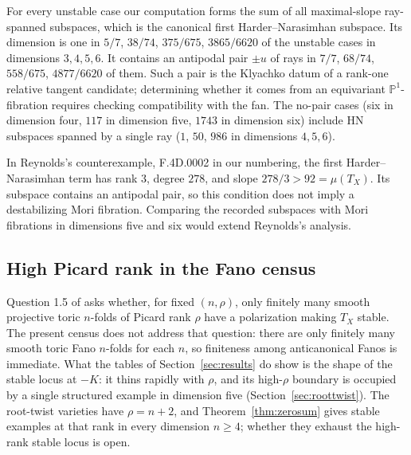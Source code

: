 \documentclass[11pt]{amsart}
\theoremstyle{definition}
\theoremstyle{remark}
\newcommand{\PP}{\mathbb{P}}
\begin{document}
For every unstable case our computation forms the sum of all
maximal-slope ray-spanned subspaces,
which is the canonical first Harder--Narasimhan subspace. Its dimension is
one in $5/7$, $38/74$, $375/675$, $3865/6620$ of the unstable cases in
dimensions $3, 4, 5, 6$. It contains an antipodal pair $\pm u$ of rays in
$7/7$, $68/74$, $558/675$, $4877/6620$ of them. Such a pair is the
Klyachko datum of a rank-one relative tangent candidate; determining whether
it comes from an equivariant $\PP^1$-fibration requires checking compatibility
with the fan. The no-pair cases (six in dimension four, $117$ in dimension
five, $1743$ in dimension six) include HN subspaces spanned by a single ray
($1$, $50$, $986$ in dimensions $4, 5, 6$).

In Reynolds's counterexample, \textsf{F.4D.0002} in our numbering, the
first Harder--Narasimhan term has rank $3$, degree $278$, and slope
$278/3>92=\mu(T_X)$. Its subspace contains an antipodal pair, so this
condition does not imply a destabilizing Mori fibration. Comparing the
recorded subspaces with Mori fibrations in dimensions five and six would
extend Reynolds's analysis.

\subsection{High Picard rank in the Fano census}
Question 1.5 of \cite{HNS2022} asks whether, for fixed $(n, \rho)$, only
finitely many smooth projective toric $n$-folds of Picard rank $\rho$
have a polarization making $T_X$ stable. The present census does not
address that question: there are only finitely many smooth toric Fano
$n$-folds for each $n$, so finiteness among anticanonical Fanos is
immediate. What the tables of Section~\ref{sec:results} do show is the
shape of the stable locus at $-K$: it thins rapidly with $\rho$, and
its high-$\rho$ boundary is occupied by a single structured example in
dimension five (Section~\ref{sec:roottwist}). The root-twist varieties have
$\rho=n+2$, and Theorem~\ref{thm:zerosum} gives stable examples at that rank
in every dimension $n\ge4$; whether they exhaust the high-rank stable locus
is open.
\end{document}
